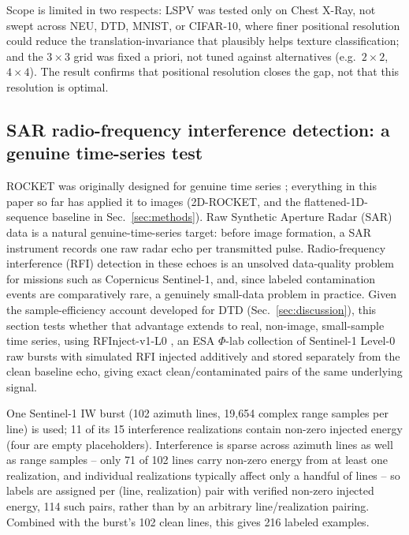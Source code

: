 \documentclass[a4paper,fleqn]{cas-sc}
\begin{document}
Scope is limited in two respects: LSPV was tested only on Chest X-Ray, not swept across NEU, DTD, MNIST, or CIFAR-10, where finer positional resolution could reduce the translation-invariance that plausibly helps texture classification; and the $3\times3$ grid was fixed a priori, not tuned against alternatives (e.g.\ $2\times2$, $4\times4$). The result confirms that positional resolution closes the gap, not that this resolution is optimal.

\subsection{SAR radio-frequency interference detection: a genuine time-series test}\label{sec:sar}

ROCKET was originally designed for genuine time series \citep{dempster2020rocket}; everything in this paper so far has applied it to images (2D-ROCKET, and the flattened-1D-sequence baseline in Sec.~\ref{sec:methods}). Raw Synthetic Aperture Radar (SAR) data is a natural genuine-time-series target: before image formation, a SAR instrument records one raw radar echo per transmitted pulse. Radio-frequency interference (RFI) detection in these echoes is an unsolved data-quality problem for missions such as Copernicus Sentinel-1, and, since labeled contamination events are comparatively rare, a genuinely small-data problem in practice. Given the sample-efficiency account developed for DTD (Sec.~\ref{sec:discussion}), this section tests whether that advantage extends to real, non-image, small-sample time series, using RFInject-v1-L0 \citep{delprete2025rfinject}, an ESA $\Phi$-lab collection of Sentinel-1 Level-0 raw bursts with simulated RFI injected additively and stored separately from the clean baseline echo, giving exact clean/contaminated pairs of the same underlying signal.

One Sentinel-1 IW burst (102 azimuth lines, 19{,}654 complex range samples per line) is used; 11 of its 15 interference realizations contain non-zero injected energy (four are empty placeholders). Interference is sparse across azimuth lines as well as range samples -- only 71 of 102 lines carry non-zero energy from at least one realization, and individual realizations typically affect only a handful of lines -- so labels are assigned per (line, realization) pair with verified non-zero injected energy, 114 such pairs, rather than by an arbitrary line/realization pairing. Combined with the burst's 102 clean lines, this gives 216 labeled examples.
\end{document}
